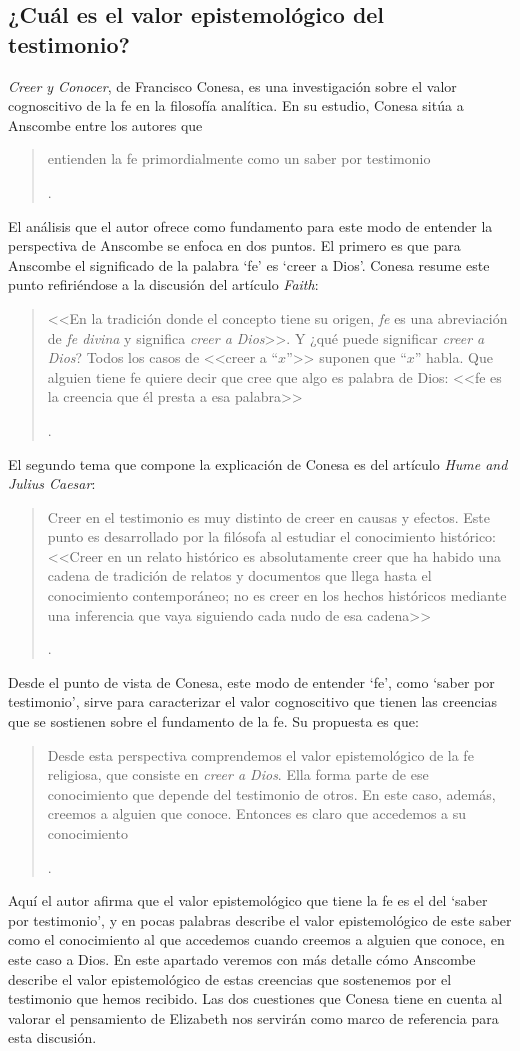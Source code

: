 \subsection{¿Cuál es el valor epistemológico del testimonio?}

\emph{Creer y Conocer}, de Francisco Conesa, es una investigación sobre el valor cognoscitivo de la fe en la filosofía analítica. En su estudio, Conesa sitúa a Anscombe entre los autores que \blockquote[{\cite[84]{conesa1994cc}}.]{entienden la fe primordialmente como un saber por testimonio}. El análisis que el autor ofrece como fundamento para este modo de entender la perspectiva de Anscombe se enfoca en dos puntos. El primero es que para Anscombe el significado de la palabra `fe' es `creer a Dios'. Conesa resume este punto refiriéndose a la discusión del artículo \emph{Faith}: \blockquote[{\cite[87-88]{conesa1994cc}}.]{<<En la tradición donde el concepto tiene su origen, \emph{fe} es una abreviación de \emph{fe divina} y significa \emph{creer a Dios}>>. Y ¿qué puede significar \emph{creer a Dios}? Todos los casos de <<creer a ``$x$''>> suponen que ``$x$'' habla. Que alguien tiene fe quiere decir que cree que algo es palabra de Dios: <<fe es la creencia que él presta a esa palabra>>}. El segundo tema que compone la explicación de Conesa es del artículo \emph{Hume and Julius Caesar}: \blockquote[{\Cite[88]{conesa1994cc}}.]{Creer en el testimonio es muy distinto de creer en causas y efectos. Este punto es desarrollado por la filósofa al estudiar el conocimiento histórico: <<Creer en un relato histórico es absolutamente creer que ha habido una cadena de tradición de relatos y documentos que llega hasta el conocimiento contemporáneo; no es creer en los hechos históricos mediante una inferencia que vaya siguiendo cada nudo de esa cadena>>}.

Desde el punto de vista de Conesa, este modo de entender `fe', como `saber por testimonio', sirve para caracterizar el valor cognoscitivo que tienen las creencias que se sostienen sobre el fundamento de la fe. Su propuesta es que: \blockquote[{\Cite[88]{conesa1994cc}}.]{Desde esta perspectiva comprendemos el valor epistemológico de la fe religiosa, que consiste en \emph{creer a Dios}. Ella forma parte de ese conocimiento que depende del testimonio de otros. En este caso, además, creemos a alguien que conoce. Entonces es claro que accedemos a su conocimiento}. Aquí el autor afirma que el valor epistemológico que tiene la fe es el del `saber por testimonio', y en pocas palabras describe el valor epistemológico de este saber como el conocimiento al que accedemos cuando creemos a alguien que conoce, en este caso a Dios. En este apartado veremos con más detalle cómo Anscombe describe el valor epistemológico de estas creencias que sostenemos por el testimonio que hemos recibido. Las dos cuestiones que Conesa tiene en cuenta al valorar el pensamiento de Elizabeth nos servirán como marco de referencia para esta discusión.


